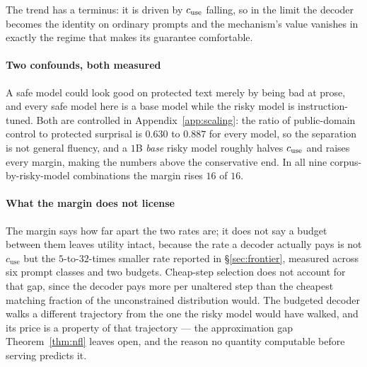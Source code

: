 The trend has a terminus: it is driven by $c_{\rm use}$ falling, so in the limit the decoder becomes
the identity on ordinary prompts and the mechanism's value vanishes in exactly the regime that makes
its guarantee comfortable.

\paragraph{Two confounds, both measured}
A safe model could look good on protected text merely by being bad at prose, and every safe model
here is a base model while the risky model is instruction-tuned. Both are controlled in
Appendix~\ref{app:scaling}: the ratio of public-domain control to protected surprisal is $0.630$ to
$0.887$ for every model, so the separation is not general fluency, and a $1$B \emph{base} risky
model roughly halves $c_{\rm use}$ and raises every margin, making the numbers above the
conservative end. In all nine corpus-by-risky-model combinations the margin rises $16$ of $16$.

\paragraph{What the margin does not license}\label{sec:price}
The margin says how far apart the two rates are; it does not say a budget between them leaves
utility intact, because the rate a decoder actually pays is not $c_{\mathrm{use}}$ but the
$5$-to-$32$-times smaller rate reported in §\ref{sec:frontier}, measured across six prompt classes
and two budgets. Cheap-step selection does not account for that gap, since the decoder pays more
per unaltered step than the cheapest matching fraction of the unconstrained distribution would. The
budgeted decoder walks a different trajectory from the one the risky model would have walked, and
its price is a property of that trajectory --- the approximation gap Theorem~\ref{thm:nfl} leaves
open, and the reason no quantity computable before serving predicts it.
